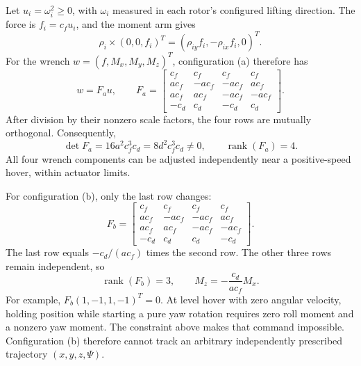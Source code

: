 \documentclass[12pt,a4paper,twoside]{article}
\begin{document}
Let $u_i=\omega_i^2\geq0$, with $\omega_i$ measured in each rotor's configured lifting direction. The force is $f_i=c_fu_i$, and the moment arm gives
\begin{equation}
 \rho_i\times(0,0,f_i)^T=(\rho_{iy}f_i,-\rho_{ix}f_i,0)^T.
\end{equation}
For the wrench $w=(f,M_x,M_y,M_z)^T$, configuration (a) therefore has
\begin{equation}
 w=F_a u,\qquad
 F_a=\begin{bmatrix}
 c_f&c_f&c_f&c_f\\
 ac_f&-ac_f&-ac_f&ac_f\\
 ac_f&ac_f&-ac_f&-ac_f\\
 -c_d&c_d&-c_d&c_d
 \end{bmatrix}.
 \label{eq:fa}
\end{equation}
After division by their nonzero scale factors, the four rows are mutually orthogonal. Consequently,
\begin{equation}
 \det F_a=16a^2c_f^3c_d=8d^2c_f^3c_d\ne0,
 \qquad \operatorname{rank}(F_a)=4.
\end{equation}
All four wrench components can be adjusted independently near a positive-speed hover, within actuator limits.

For configuration (b), only the last row changes:
\begin{equation}
 F_b=\begin{bmatrix}
 c_f&c_f&c_f&c_f\\
 ac_f&-ac_f&-ac_f&ac_f\\
 ac_f&ac_f&-ac_f&-ac_f\\
 -c_d&c_d&c_d&-c_d
 \end{bmatrix}.
 \label{eq:fb}
\end{equation}
The last row equals $-c_d/(ac_f)$ times the second row. The other three rows remain independent, so
\begin{equation}
 \boxed{\operatorname{rank}(F_b)=3,\qquad M_z=-\frac{c_d}{ac_f}M_x.}
\end{equation}
For example, $F_b(1,-1,1,-1)^T=0$. At level hover with zero angular velocity, holding position while starting a pure yaw rotation requires zero roll moment and a nonzero yaw moment. The constraint above makes that command impossible. Configuration (b) therefore cannot track an arbitrary independently prescribed trajectory $(x,y,z,\Psi)$.
\end{document}
